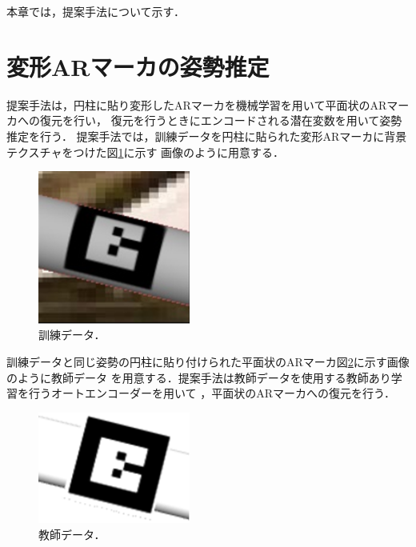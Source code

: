 本章では，提案手法について示す．

\section{変形ARマーカの姿勢推定}
提案手法は，円柱に貼り変形したARマーカを機械学習を用いて平面状のARマーカへの復元を行い，
復元を行うときにエンコードされる潜在変数を用いて姿勢推定を行う．
提案手法では，訓練データを円柱に貼られた変形ARマーカに背景テクスチャをつけた図\ref{hennkei}に示す
画像のように用意する．

      \begin{figure}[htbp]
      \begin{center}
      \includegraphics[width=50mm]{figure/eps/変形.eps}
      \caption{訓練データ．}
      \label{hennkei}
      \end{center}
      \end{figure}

訓練データと同じ姿勢の円柱に貼り付けられた平面状のARマーカ図\ref{heimen}に示す画像のように教師データ
を用意する．提案手法は教師データを使用する教師あり学習を行うオートエンコーダーを用いて
，平面状のARマーカへの復元を行う．

      \begin{figure}[htbp]
      \begin{center}
      \includegraphics[width=50mm]{figure/eps/平面.eps}
      \caption{教師データ．}
      \label{heimen}
      \end{center}
      \end{figure}

